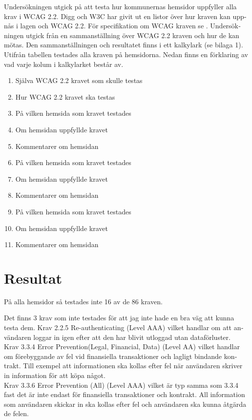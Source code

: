 \documentclass[11p]{article}
\begin{document}
\begin{otherlanguage}{swedish}
    Undersökningen utgick på att testa hur kommunernas hemsidor uppfyller alla krav i WCAG 2.2.
    Digg och W3C har givit ut en listor över hur kraven kan uppnås i lagen och WCAG 2.2.
    För specifikation om WCAG kraven se \textcite{WCAG_2.2}.
    Undersökningen utgick från en sammanställning över WCAG 2.2 kraven och hur de kan mötas.
    Den sammanställningen och resultatet finns i ett kalkylark (se bilaga 1).
    Utifrån tabellen testades alla kraven på hemsidorna.
    Nedan finns en förklaring av vad varje kolum i kalkylarket består av.
    \begin{enumerate}
        \item Själva WCAG 2.2 kravet som skulle testas
        \item Hur WCAG 2.2 kravet ska testas
        \item På vilken hemsida som kravet testades
        \item Om hemsidan uppfyllde kravet
        \item Kommentarer om hemsidan
        \item På vilken hemsida som kravet testades
        \item Om hemsidan uppfyllde kravet
        \item Kommentarer om hemsidan
        \item På vilken hemsida som kravet testades
        \item Om hemsidan uppfyllde kravet
        \item Kommentarer om hemsidan
    \end{enumerate}

    \section{Resultat}

    På alla hemsidor så testades inte 16 av de 86 kraven.

    Det finns 3 krav som inte testades för att jag inte hade en bra väg att kunna testa dem.
    Krav 2.2.5 Re-authenticating (Level AAA) vilket handlar om att användaren loggar in igen efter att den har blivit utloggad utan dataförluster.
   \\ Krav 3.3.4 Error Prevention(Legal, Financial, Data) (Level AA) vilket handlar om förebyggande av fel vid finansiella transaktioner och lagligt bindande kontrakt.
    Till exempel att informationen ska kollas efter fel när användaren skriver in information för att köpa något.
  \\  Krav 3.3.6 Error Prevention (All) (Level AAA) vilket är typ samma som 3.3.4 fast det är inte endast för finansiella transaktioner och kontrakt.
    All information som användaren skickar in ska kollas efter fel och användaren ska kunna åtgärda de felen.


\end{otherlanguage}
\end{document}
